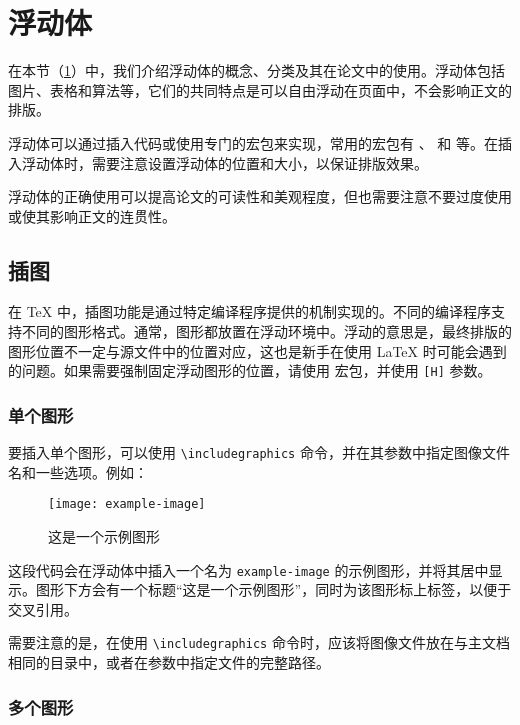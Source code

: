 \section{浮动体}\label{sec:float}

在本节（\cref{sec:float}）中，我们介绍浮动体的概念、分类及其在论文中的使用。浮动体包括图片、表格和算法等，它们的共同特点是可以自由浮动在页面中，不会影响正文的排版。

浮动体可以通过插入代码或使用专门的宏包来实现，常用的宏包有 、 和  等。在插入浮动体时，需要注意设置浮动体的位置和大小，以保证排版效果。

浮动体的正确使用可以提高论文的可读性和美观程度，但也需要注意不要过度使用或使其影响正文的连贯性。

\subsection{插图}

在 \TeX{} 中，插图功能是通过特定编译程序提供的机制实现的。不同的编译程序支持不同的图形格式。通常，图形都放置在浮动环境中。浮动的意思是，最终排版的图形位置不一定与源文件中的位置对应，这也是新手在使用 \LaTeX{} 时可能会遇到的问题。如果需要强制固定浮动图形的位置，请使用  宏包，并使用 \texttt{[H]} 参数。

\subsubsection{单个图形}

要插入单个图形，可以使用 \verb|\includegraphics| 命令，并在其参数中指定图像文件名和一些选项。例如：

\begin{figure}[htbp]
    \centering
    \texttt{[image: example-image]}
    \caption{这是一个示例图形}
    \label{fig:example}
\end{figure}

这段代码会在浮动体中插入一个名为 \verb|example-image| 的示例图形，并将其居中显示。图形下方会有一个标题“这是一个示例图形”，同时为该图形标上标签，以便于交叉引用。

需要注意的是，在使用 \verb|\includegraphics| 命令时，应该将图像文件放在与主文档相同的目录中，或者在参数中指定文件的完整路径。

\subsubsection{多个图形}

